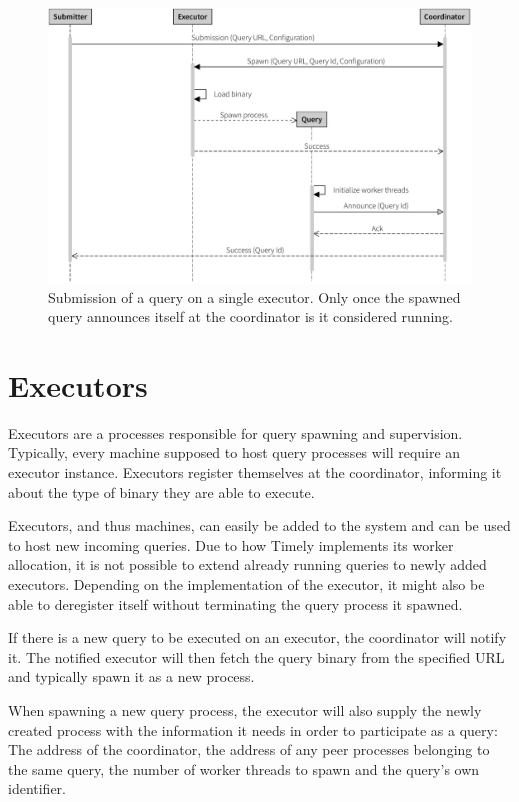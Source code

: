 \begin{figure}[htb]
  \centering
    \includegraphics[width=1\textwidth]{figures/spawn_singleprocess}
  \caption[Query submission with single process.]{Submission of a query on a single executor.
  Only once the spawned query announces itself at the coordinator is it considered running.}
  \label{fig:subsingle}
\end{figure}

\section{Executors}

Executors are a processes responsible for query spawning and supervision. Typically,
every machine supposed to host query processes will require an executor
instance. Executors register themselves at the coordinator, informing it about
the type of binary they are able to execute. 

Executors, and thus machines, can easily be added to the system and can be used
to host new incoming queries. Due to how Timely implements its worker allocation,
it is not possible to extend already running queries to newly added executors.
Depending on the implementation of the executor, it might also be able to
deregister itself without terminating the query process it spawned.

If there is a new query to be executed on an executor, the coordinator will notify
it. The notified executor will then fetch the query binary from the specified URL
and typically spawn it as a new process.

When spawning a new query process, the executor will also supply the newly created
process with the information it needs in order to participate as a query:
The address of the coordinator, the address of any peer processes belonging to the 
same query, the number of worker threads to spawn and the query's own identifier.

